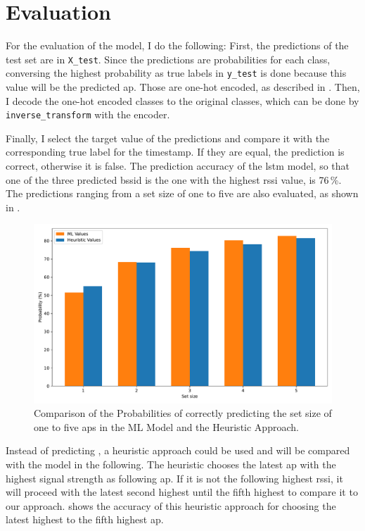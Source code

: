 \chapter{Evaluation}\label{ch:evaluation}

For the evaluation of the model, I do the following:
First, the predictions of the test set are in \texttt{X\_test}.
Since the predictions are probabilities for each class, conversing the highest probability as true labels in \texttt{y\_test} is done because this value will be the predicted \ac{ap}.
Those are one-hot encoded, as described in .
Then, I decode the one-hot encoded classes to the original classes, which can be done by \texttt{inverse\_transform} with the encoder.

Finally, I select the target value of the predictions and compare it with the corresponding true label for the timestamp.
If they are equal, the prediction is correct, otherwise it is false.
The \threeAP prediction accuracy of the \ac{lstm} model, so that one of the three predicted \ac{bssid} is the one with the highest \ac{rssi} value, is 76\,\%.
The predictions ranging from a set size of one to five are also evaluated, as shown in .

\begin{figure}[h]
    \centering
    \includegraphics*[scale=0.53]{images/comparison_ml_heuristic_1_to_5.pdf}
    \caption{Comparison of the Probabilities of correctly predicting the set size of one to five \acp{ap} in the ML Model and the Heuristic Approach.}
    \label{fig:comparison_ml_heuristic_1_to_5}
\end{figure}

Instead of predicting \threeAP, a heuristic approach could be used and will be compared with the model in the following.
The heuristic chooses the latest \ac{ap} with the highest signal strength as following \ac{ap}.
If it is not the following highest \ac{rssi}, it will proceed with the latest second highest until the fifth highest to compare it to our approach. %
 shows the accuracy of this heuristic approach for choosing the latest highest to the fifth highest \ac{ap}.

